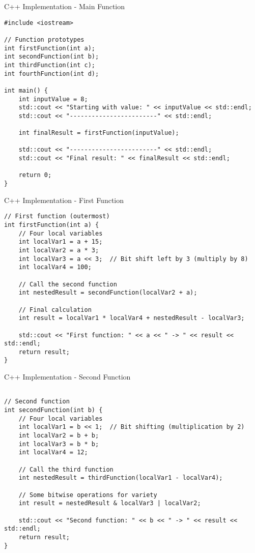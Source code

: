 \documentclass[aspectratio=169]{beamer}
\begin{document}
\begin{frame}[fragile]{C++ Implementation - Main Function}
    \begin{verbatim}
#include <iostream>

// Function prototypes
int firstFunction(int a);
int secondFunction(int b);
int thirdFunction(int c);
int fourthFunction(int d);

int main() {
    int inputValue = 8;
    std::cout << "Starting with value: " << inputValue << std::endl;
    std::cout << "------------------------" << std::endl;
    
    int finalResult = firstFunction(inputValue);
    
    std::cout << "------------------------" << std::endl;
    std::cout << "Final result: " << finalResult << std::endl;
    
    return 0;
}
    \end{verbatim}
\end{frame}

\begin{frame}[fragile]{C++ Implementation - First Function}
    \begin{verbatim}
// First function (outermost)
int firstFunction(int a) {
    // Four local variables
    int localVar1 = a + 15;
    int localVar2 = a * 3;
    int localVar3 = a << 3;  // Bit shift left by 3 (multiply by 8)
    int localVar4 = 100;
    
    // Call the second function
    int nestedResult = secondFunction(localVar2 + a);
    
    // Final calculation
    int result = localVar1 * localVar4 + nestedResult - localVar3;
    
    std::cout << "First function: " << a << " -> " << result << std::endl;
    return result;
}

\end{verbatim}
\end{frame}

\begin{frame}[fragile]{C++ Implementation - Second Function}
    \begin{verbatim}

// Second function
int secondFunction(int b) {
    // Four local variables
    int localVar1 = b << 1;  // Bit shifting (multiplication by 2)
    int localVar2 = b + b;
    int localVar3 = b * b;
    int localVar4 = 12;
    
    // Call the third function
    int nestedResult = thirdFunction(localVar1 - localVar4);
    
    // Some bitwise operations for variety
    int result = nestedResult & localVar3 | localVar2;
    
    std::cout << "Second function: " << b << " -> " << result << std::endl;
    return result;
}
    \end{verbatim}
\end{frame}
\end{document}
